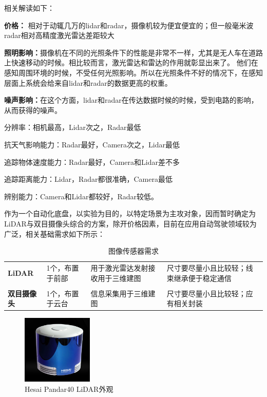 相关解读如下：

\textbf{价格：} 相对于动辄几万的lidar和radar，摄像机较为便宜便宜的；但一般毫米波radar相对高精度激光雷达差距较大

\textbf{照明影响：}摄像机在不同的光照条件下的性能是非常不一样，尤其是无人车在道路上快速移动的时候。相比较而言，激光雷达和雷达的作用就彰显出来了。 他们在感知周围环境的时候，不受任何光照影响。所以在光照条件不好的情况下，在感知层面上系统会给来自lidar和radar的数据更高的权重。

\textbf{噪声影响：}在这个方面，lidar和radar在传达数据时候的时候，受到电路的影响，从而获得的噪声。

分辨率：相机最高，Lidar次之，Radar最低

抗天气影响能力：Radar最好，Camera次之，Lidar最低

追踪物体速度能力：Radar最好，Camera和Lidar差不多

追踪距离能力：Lidar，Radar都很准确，Camera最低

辨别能力：Camera和Lidar都较好，Radar较低。

作为一个自动化底盘，以实验为目的，以特定场景为主攻对象，因而暂时确定为LiDAR与双目摄像头综合的方案，除开价格因素，目前在应用自动驾驶领域较为广泛，相关基础需求如下所示：

\begin{table}[H]
	\centering%
	\caption[centering]{图像传感器需求}%
	\label{txxq}%
	\begin{tabular}{C{2cm}C{3cm}p{3cm}p{4cm}}	
		\toprule
		 & & &\\ 
		\midrule
		
		\textbf{LiDAR} & 1个，布置于前部 & 用于激光雷达发射接收用于三维建图 & 尺寸要尽量小且比较轻；线束继承便于稳定通信 \\
		\\
		\textbf{双目摄像头} & 1个，布置于云台 & 信息采集用于三维建图 & 尺寸要尽量小且比较轻；应有相关封装 \\		
		
		\bottomrule
	\end{tabular}
\end{table}

\begin{figure}[H]
	\centering
	\includegraphics[width = 0.3\textwidth]{fig/LiDAR.png}
	\caption{Hesai Pandar40 LiDAR外观}
	\label{LiDAR}
\end{figure}

